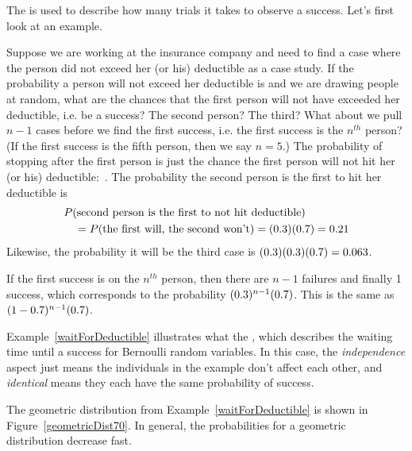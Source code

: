 The 
is used to describe how
many trials it takes to observe a success.
Let's first look at an example.

\begin{examplewrap}
\begin{nexample}{Suppose we are working at the insurance
    company and need to find a case where the person did
    not exceed her (or his) deductible as a case study.
    If the probability a person will not exceed her
    deductible is \insureSprob{} and we are drawing people
    at random, what are the chances that the first person
    will not have exceeded her deductible, i.e. be a success?
    The second person?
    The third?
    What about we pull $n - 1$ cases before we find
    the first success, i.e. the first success is the
    $n^{th}$ person?
    (If the first success is the fifth person, then we say $n=5$.)}
  \label{waitForDeductible}%
  The probability of stopping after the first person is just
  the chance the first person will not hit her (or his)
  deductible:~\insureSprob{}.
  The probability the second person is the first to hit
  her deductible is
  \begin{align*}
  &P(\text{second person is the first to not hit deductible}) \\
  &\quad
    = P(\text{the first will, the second won't})
    = (0.3{})(0.7{})
    = 0.21{}
  \end{align*}
  Likewise, the probability it will be the third case is
  $(0.3{})(0.3{})(0.7{})
    = 0.063$.

  If the first success is on the $n^{th}$ person,
  then there are $n-1$ failures and finally 1 success,
  which corresponds to the probability
  $(0.3{})^{n-1}(0.7{})$.
  This is the same as
  $(1-0.7{})^{n-1}(0.7{})$.
\end{nexample}
\end{examplewrap}

Example~\ref{waitForDeductible} illustrates what the
,
which describes the waiting
time until a success for
Bernoulli random variables.
In this case, the \emph{independence} aspect just means
the individuals in the example don't affect each other,
and \emph{identical} means they each have the same probability
of success.

The geometric distribution from Example~\ref{waitForDeductible} is shown in Figure~\ref{geometricDist70}. In general, the probabilities for a geometric distribution decrease  fast.

